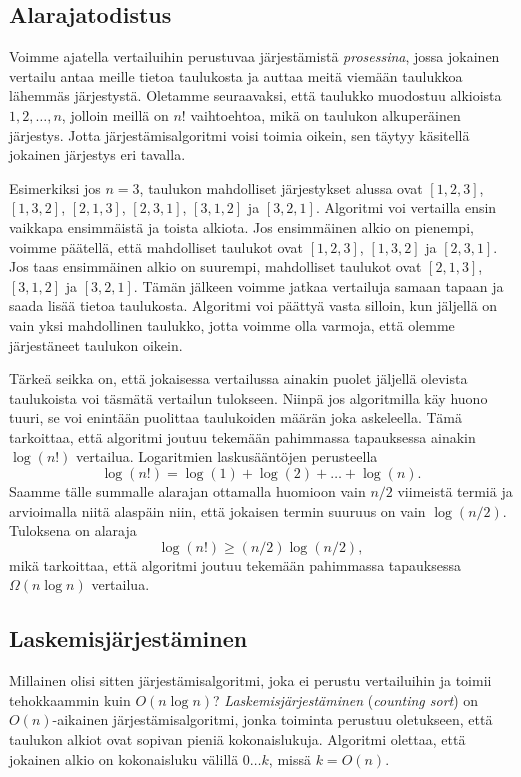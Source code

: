 \subsection{Alarajatodistus}

Voimme ajatella vertailuihin perustuvaa järjestämistä
\emph{prosessina}, jossa jokainen vertailu antaa meille tietoa
taulukosta ja auttaa meitä viemään taulukkoa lähemmäs järjestystä.
Oletamme seuraavaksi, että taulukko muodostuu alkioista
$1,2,\dots,n$, jolloin meillä on $n!$ vaihtoehtoa, mikä
on taulukon alkuperäinen järjestys.
Jotta järjestämisalgoritmi voisi toimia oikein,
sen täytyy käsitellä jokainen järjestys eri tavalla.

Esimerkiksi jos $n=3$, taulukon mahdolliset järjestykset alussa ovat
$[1,2,3]$, $[1,3,2]$, $[2,1,3]$, $[2,3,1]$, $[3,1,2]$ ja $[3,2,1]$.
Algoritmi voi vertailla ensin vaikkapa ensimmäistä ja toista alkiota.
Jos ensimmäinen alkio on pienempi, voimme päätellä,
että mahdolliset taulukot ovat $[1,2,3]$, $[1,3,2]$ ja $[2,3,1]$.
Jos taas ensimmäinen alkio on suurempi,
mahdolliset taulukot ovat $[2,1,3]$, $[3,1,2]$ ja $[3,2,1]$.
Tämän jälkeen voimme jatkaa vertailuja samaan tapaan
ja saada lisää tietoa taulukosta.
Algoritmi voi päättyä vasta silloin, kun jäljellä on vain yksi
mahdollinen taulukko, jotta voimme olla varmoja, että olemme
järjestäneet taulukon oikein.

Tärkeä seikka on, että jokaisessa vertailussa ainakin puolet jäljellä
olevista taulukoista voi täsmätä vertailun tulokseen.
Niinpä jos algoritmilla käy huono tuuri, se voi enintään puolittaa
taulukoiden määrän joka askeleella.
Tämä tarkoittaa, että algoritmi joutuu tekemään pahimmassa
tapauksessa ainakin $\log(n!)$ vertailua.
Logaritmien laskusääntöjen perusteella
\[
\log(n!) = \log(1)+\log(2)+\dots+\log(n).
\]
Saamme tälle summalle alarajan ottamalla huomioon vain
$n/2$ viimeistä termiä ja arvioimalla niitä alaspäin niin, 
että jokaisen termin suuruus on vain $\log(n/2)$. Tuloksena on alaraja
\[
\log(n!) \ge (n/2) \log(n/2),
\]
mikä tarkoittaa, että algoritmi joutuu tekemään
pahimmassa tapauksessa $\Omega(n \log n)$ vertailua.

\subsection{Laskemisjärjestäminen}


Millainen olisi sitten järjestämisalgoritmi,
joka ei perustu vertailuihin ja toimii
tehokkaammin kuin $O(n \log n)$?
\emph{Laskemisjärjestäminen} (\emph{counting sort})
on $O(n)$-aikainen järjestämisalgoritmi,
jonka toiminta perustuu oletukseen, että taulukon alkiot
ovat sopivan pieniä kokonaislukuja.
Algoritmi olettaa, että jokainen alkio on
kokonaisluku välillä $0 \dots k$, missä $k=O(n)$.


